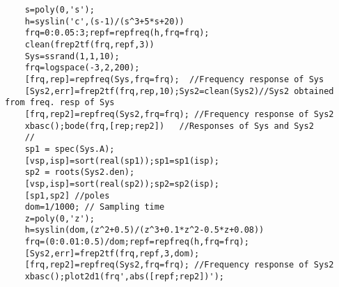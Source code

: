 \begin{examples}
  \begin{Verbatim}
    s=poly(0,'s');
    h=syslin('c',(s-1)/(s^3+5*s+20))
    frq=0:0.05:3;repf=repfreq(h,frq=frq);
    clean(frep2tf(frq,repf,3))
    Sys=ssrand(1,1,10); 
    frq=logspace(-3,2,200);
    [frq,rep]=repfreq(Sys,frq=frq);  //Frequency response of Sys
    [Sys2,err]=frep2tf(frq,rep,10);Sys2=clean(Sys2)//Sys2 obtained from freq. resp of Sys
    [frq,rep2]=repfreq(Sys2,frq=frq); //Frequency response of Sys2
    xbasc();bode(frq,[rep;rep2])   //Responses of Sys and Sys2
    // 
    sp1 = spec(Sys.A);
    [vsp,isp]=sort(real(sp1));sp1=sp1(isp);
    sp2 = roots(Sys2.den);
    [vsp,isp]=sort(real(sp2));sp2=sp2(isp);
    [sp1,sp2] //poles
    dom=1/1000; // Sampling time 
    z=poly(0,'z');
    h=syslin(dom,(z^2+0.5)/(z^3+0.1*z^2-0.5*z+0.08))
    frq=(0:0.01:0.5)/dom;repf=repfreq(h,frq=frq);
    [Sys2,err]=frep2tf(frq,repf,3,dom);
    [frq,rep2]=repfreq(Sys2,frq=frq); //Frequency response of Sys2
    xbasc();plot2d1(frq',abs([repf;rep2])');
  \end{Verbatim}
\end{examples}
\begin{manseealso}
        
\end{manseealso}
